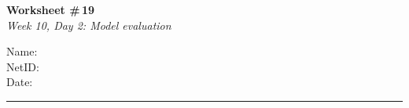 \documentclass[11pt]{article}
\begin{document}
\noindent
\begin{minipage}[t]{0.55\textwidth}
  \vspace{0pt}
  {\LARGE \textbf{Worksheet \#\,19}} \\[0.3em]
  {\large \textit{Week 10, Day 2: Model evaluation}}
\end{minipage}
\hfill
\begin{minipage}[t]{0.40\textwidth}
  \vspace{0pt}
  \begin{mdframed}[linecolor=black, linewidth=1pt, innertopmargin=10pt, innerbottommargin=10pt]
    \small
    \vspace{0.4cm}
    Name: \underline{\hspace{4.5cm}} \\[1em]
    NetID: \underline{\hspace{4.3cm}} \\[1em]
    Date: \underline{\hspace{4.4cm}} \\
  \end{mdframed}
\end{minipage}

\vspace{1em}
\noindent\rule{\linewidth}{1pt}
\vspace{0.2em}
\end{document}
